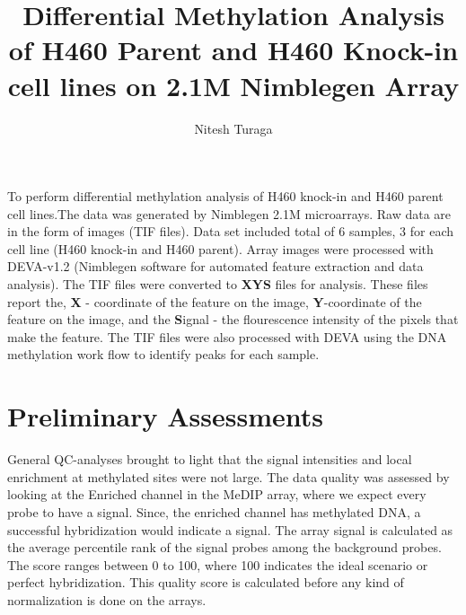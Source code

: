 \documentclass[11pt]{article}
\begin{document}
\newcommand\NAME{Turaga}  %
\newcommand\ANDREWID{nturaga1@jhmi.edu}     %

\title{Differential Methylation Analysis of H460 Parent and H460 Knock-in cell lines on 2.1M Nimblegen Array}
\author{Nitesh Turaga}
\maketitle



To perform differential methylation analysis of H460 knock-in and H460 parent cell lines.The data was generated by Nimblegen 2.1M microarrays. Raw data are in the form of images (TIF files). Data set included total of 6 samples, 3 for each cell line (H460 knock-in and H460 parent). Array images were processed with DEVA-v1.2 (Nimblegen software for automated feature extraction and data analysis). The TIF files were converted to {\bf XYS} files for analysis. These files report the, {\bf X} - coordinate of the feature on the image, {\bf Y}-coordinate of the feature on the image, and the {\bf S}ignal - the flourescence intensity of the pixels that make the feature. The TIF files were also processed with DEVA using the DNA methylation work flow to identify peaks for each sample.

\section*{Preliminary Assessments}


General QC-analyses brought to light that the signal intensities and local enrichment at methylated sites were not large. The data quality was assessed by looking at the Enriched channel in the MeDIP array, where we expect every probe to have a signal. Since, the enriched channel has methylated DNA, a successful hybridization would indicate a signal. The array signal is calculated as the average percentile rank of the signal probes among the background probes. The score ranges between 0 to 100, where 100 indicates the ideal scenario or perfect hybridization. This quality score is calculated before any kind of normalization is done on the arrays.
\end{document}
